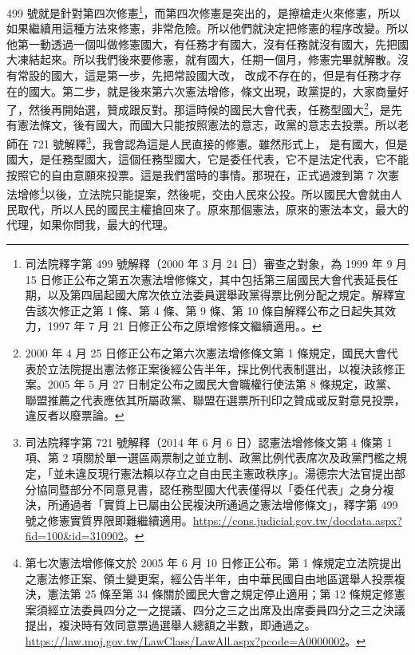 \hypertarget{w05:cue:335}{}499 號就是針對第四次修憲\footnote{司法院釋字第 499 號解釋（2000 年 3 月 24 日）審查之對象，為 1999 年 9 月 15 日修正公布之第五次憲法增修條文，其中包括第三屆國民大會代表延長任期，以及第四屆起國大席次依立法委員選舉政黨得票比例分配之規定。解釋宣告該次修正之第 1 條、第 4 條、第 9 條、第 10 條自解釋公布之日起失其效力，1997 年 7 月 21 日修正公布之原增修條文繼續適用。\cite{jy499}。}，而第四次修憲是突出的，是擦槍走火來修憲，所以如果繼續用這種方法來修憲，非常危險。所以他們就決定把修憲的程序改變。所以他第一動透過一個叫做修憲國大，有任務才有國大，沒有任務就沒有國大，先把國大凍結起來。所以我們後來要修憲，就有國大，任期一個月，修憲完畢就解散。沒有常設的國大，這是第一步，先把常設國大改，
\hypertarget{w05:cue:336}{}改成不存在的，但是有任務才存在的國大。第二步，就是後來第六次憲法增修，條文出現，政黨提的，大家商量好了，然後再開始選，贊成跟反對。那這時候的國民大會代表，任務型國大\footnote{2000 年 4 月 25 日修正公布之第六次憲法增修條文第 1 條規定，國民大會代表於立法院提出憲法修正案後經公告半年，採比例代表制選出，以複決該修正案。2005 年 5 月 27 日制定公布之國民大會職權行使法第 8 條規定，政黨、聯盟推薦之代表應依其所屬政黨、聯盟在選票所刊印之贊成或反對意見投票，違反者以廢票論。}，是先有憲法條文，後有國大，而國大只能按照憲法的意志，政黨的意志去投票。所以老師在 721 號解釋\footnote{司法院釋字第 721 號解釋（2014 年 6 月 6 日）認憲法增修條文第 4 條第 1 項、第 2 項關於單一選區兩票制之並立制、政黨比例代表席次及政黨門檻之規定，「並未違反現行憲法賴以存立之自由民主憲政秩序」。湯德宗大法官提出部分協同暨部分不同意見書，認任務型國大代表僅得以「委任代表」之身分複決，所通過者「實質上已屬由公民複決所通過之憲法增修條文」，釋字第 499 號之修憲實質界限即難繼續適用。\url{https://cons.judicial.gov.tw/docdata.aspx?fid=100&id=310902}。}，我會認為這是人民直接的修憲。雖然形式上，
\hypertarget{w05:cue:337}{}是有國大，但是國大，是任務型國大，這個任務型國大，它是委任代表，它不是法定代表，它不能按照它的自由意願來投票。這是我們當時的事情。那現在，正式過渡到第 7 次憲法增修\footnote{第七次憲法增修條文於 2005 年 6 月 10 日修正公布。第 1 條規定立法院提出之憲法修正案、領土變更案，經公告半年，由中華民國自由地區選舉人投票複決，憲法第 25 條至第 34 條關於國民大會之規定停止適用；第 12 條規定修憲案須經立法委員四分之一之提議、四分之三之出席及出席委員四分之三之決議提出，複決時有效同意票過選舉人總額之半數，即通過之。\url{https://law.moj.gov.tw/LawClass/LawAll.aspx?pcode=A0000002}。}以後，立法院只能提案，然後呢，交由人民來公投。所以國民大會就由人民取代，所以人民的國民主權搶回來了。原來那個憲法，原來的憲法本文，最大的代理，如果你問我，最大的代理。

